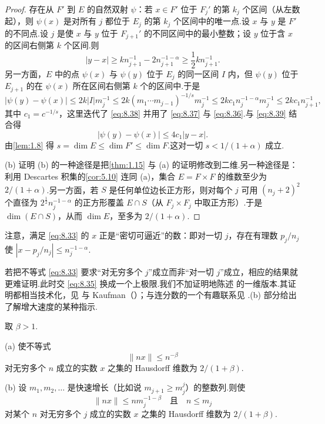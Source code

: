 \begin{proof}
存在从 $F'$ 到 $E$ 的自然双射 $\psi$：若 $x\in F'$ 位于 $F_j'$ 的第 $k_j$ 个区间（从左数起），则 $\psi(x)$ 是对所有 $j$ 都位于 $E_j$ 的第 $k_j$ 个区间中的唯一点.设 $x$ 与 $y$ 是 $F'$ 的不同点.设 $j$ 是使 $x$ 与 $y$ 位于 $F_{j+1}'$ 的不同区间中的最小整数；设 $y$ 位于含 $x$ 的区间右侧第 $k$ 个区间.则
\begin{equation}\label{eq:8.39}
  |y-x|\geq kn_{j+1}^{-1}-2n_{j+1}^{-1-\alpha}\geq\frac{1}{2}kn_{j+1}^{-1}.
\end{equation}
另一方面，$E$ 中的点 $\psi(x)$ 与 $\psi(y)$ 位于 $E_j$ 的同一区间 $I$ 内，但 $\psi(y)$ 位于 $E_{j+1}$ 的在 $\psi(x)$ 所在区间右侧第 $k$ 个的区间中.于是
\[
  |\psi(y)-\psi(x)|
  \leq 2k|I|m_j^{-1}
  \leq 2k(m_1\cdots m_{j-1})^{-1/s}m_j^{-1}
  \leq 2kc_1n_j^{-1-\alpha}m_j^{-1}
  \leq 2kc_1n_{j+1}^{-1},
\]
其中 $c_1=c^{-1/s}$，这里迭代了 \eqref{eq:8.38} 并用了 \eqref{eq:8.37} 与 \eqref{eq:8.36}.与 \eqref{eq:8.39} 结合得
\[
  |\psi(y)-\psi(x)|\leq 4c_1|y-x|.
\]
由\cref{lem:1.8} 得 $s=\dim E\leq\dim F'\leq\dim F$.这对一切 $s<1/(1+\alpha)$ 成立.

(b) 证明 (b) 的一种途径是把\cref{thm:1.15} 与 (a) 的证明修改到二维.另一种途径是：利用 Descartes 积集的\cref{cor:5.10} 连同 (a)，集合 $E=F\times F$ 的维数至少为 $2/(1+\alpha)$.另一方面，若 $S$ 是任何单位边长正方形，则对每个 $j$ 可用 $(n_j+2)^2$ 个直径为 $2^{\frac{1}{2}}n_j^{-1-\alpha}$ 的正方形覆盖 $E\cap S$（从 $F_j\times F_j$ 中取正方形）.于是 $\dim(E\cap S)$，从而 $\dim E$，至多为 $2/(1+\alpha)$.
\end{proof}

注意，满足 \eqref{eq:8.33} 的 $x$ 正是``密切可逼近''的数：即对一切 $j$，存在有理数 $p_j/n_j$ 使 $|x-p_j/n_j|\leq n_j^{-1-\alpha}$.

若把不等式 \eqref{eq:8.33} 要求``对无穷多个 $j$''成立而非``对一切 $j$''成立，相应的结果就更难证明.此时交 \eqref{eq:8.35} 换成一个上极限.我们不加证明地陈述 的一维版本.其证明都相当技术化，见 \textcites{jarnik1931,besicovitch1934b,eggleston1952} 与 Kaufman（\citeyear{kaufman1970,kaufman1981}）；与连分数的一个有趣联系见 \textcite{good1941}.(b) 部分给出了解增大速度的某种指示.

\begin{theorem}\label{thm:8.16}
取 $\beta>1$.

(a) 使不等式
\[
  \|nx\|\leq n^{-\beta}
\]
对无穷多个 $n$ 成立的实数 $x$ 之集的 Hausdorff 维数为 $2/(1+\beta)$.

(b) 设 $m_1,m_2,\ldots$ 是快速增长（比如说 $m_{j+1}\geq m_j^j$）的整数列.则使
\[
  \|nx\|\leq nm_j^{-1-\beta}\quad\text{且}\quad n\leq m_j
\]
对某个 $n$ 对无穷多个 $j$ 成立的实数 $x$ 之集的 Hausdorff 维数为 $2/(1+\beta)$.
\end{theorem}

